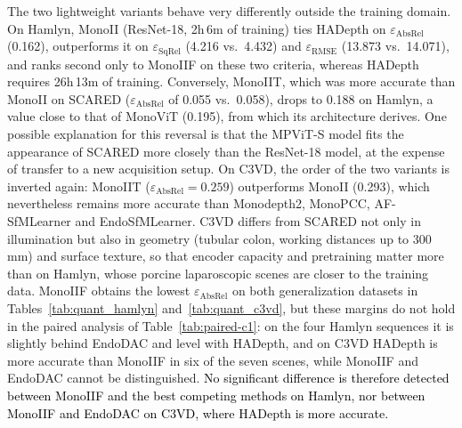 \documentclass[a4paper,fleqn]{cas-dc}
\begin{document}
{
The two lightweight variants behave very differently outside the training domain. On Hamlyn, MonoII (ResNet-18, 2h\,6m of training) ties HADepth on $\varepsilon_\textrm{AbsRel}$ (0.162), outperforms it on $\varepsilon_\textrm{SqRel}$ (4.216 vs.\ 4.432) and $\varepsilon_\textrm{RMSE}$ (13.873 vs.\ 14.071), and ranks second only to MonoIIF on these two criteria, whereas HADepth requires 26h\,13m of training. Conversely, MonoIIT, which was more accurate than MonoII on SCARED ($\varepsilon_\textrm{AbsRel}$ of 0.055 vs.\ 0.058), drops to 0.188 on Hamlyn, a value close to that of MonoViT (0.195), from which its architecture derives. One possible explanation for this reversal is that the MPViT-S model fits the appearance of SCARED more closely than the ResNet-18 model, at the expense of transfer to a new acquisition setup.
On C3VD, the order of the two variants is inverted again: MonoIIT ($\varepsilon_\textrm{AbsRel}=0.259$) outperforms MonoII (0.293), which nevertheless remains more accurate than Monodepth2, MonoPCC, AF-SfMLearner and EndoSfMLearner. C3VD differs from SCARED not only in illumination but also in geometry (tubular colon, working distances up to 300\,mm) and surface texture, so that encoder capacity and pretraining matter more than on Hamlyn, whose porcine laparoscopic scenes are closer to the training data. MonoIIF obtains the lowest $\varepsilon_\textrm{AbsRel}$ on both generalization datasets in Tables~\ref{tab:quant_hamlyn} and~\ref{tab:quant_c3vd}, but these margins do not hold in the paired analysis of Table~\ref{tab:paired-c1}: on the four Hamlyn sequences it is slightly behind EndoDAC and level with HADepth, and on C3VD HADepth is more accurate than MonoIIF in six of the seven scenes, while MonoIIF and EndoDAC cannot be distinguished. \textcolor{black}{No significant difference is therefore detected between MonoIIF and the best competing methods on Hamlyn, nor between MonoIIF and EndoDAC on C3VD, where HADepth is more accurate.}}
\end{document}
